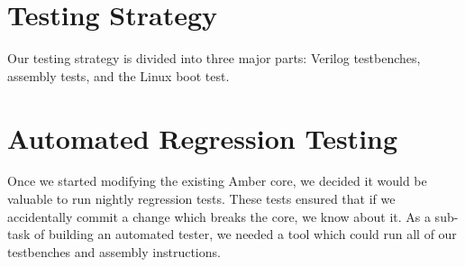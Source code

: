 \section{Testing Strategy}
Our testing strategy is divided into three major parts: Verilog testbenches, assembly tests, and the Linux boot test.

\section{Automated Regression Testing}
Once we started modifying the existing Amber core, we decided it would be valuable to run nightly regression tests. These tests ensured that if we accidentally commit a change which breaks the core, we know about it. As a sub-task of building an automated tester, we needed a tool which could run all of our testbenches and assembly instructions.